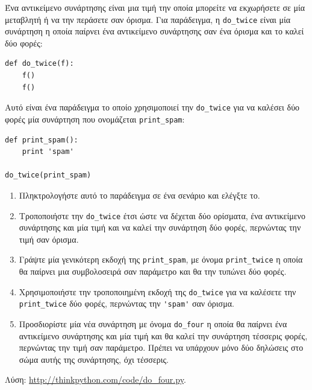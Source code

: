 \documentclass[10pt]{book}
\begin{document}
\begin{exercise}

Ένα αντικείμενο συνάρτησης είναι μια τιμή την οποία μπορείτε να εκχωρήσετε
σε μία μεταβλητή ή να την περάσετε σαν όρισμα. Για παράδειγμα, η \verb"do_twice" είναι μία συνάρτηση η οποία παίρνει ένα αντικείμενο συνάρτησης σαν ένα όρισμα και το καλεί δύο φορές:


\begin{verbatim}
def do_twice(f):
    f()
    f()
\end{verbatim}

Αυτό είναι ένα παράδειγμα το οποίο χρησιμοποιεί την \verb"do_twice" για να καλέσει δύο φορές μία συνάρτηση που ονομάζεται \verb"print_spam":


\begin{verbatim}
def print_spam():
    print 'spam'

do_twice(print_spam)
\end{verbatim}

\begin{enumerate}


\item Πληκτρολογήστε αυτό το παράδειγμα σε ένα σενάριο και ελέγξτε το.


\item Τροποποιήστε την \verb"do_twice" έτσι ώστε να δέχεται δύο ορίσματα, ένα
αντικείμενο συνάρτησης και μία τιμή και να καλεί την συνάρτηση δύο φορές, περνώντας την τιμή σαν όρισμα.


\item Γράψτε μία γενικότερη εκδοχή της \verb"print_spam", με όνομα
\verb"print_twice" η οποία θα παίρνει μια συμβολοσειρά σαν παράμετρο και θα την
τυπώνει δύο φορές.


\item Χρησιμοποιήστε την τροποποιημένη εκδοχή της \verb"do_twice" για να καλέσετε την \verb"print_twice" δύο φορές, περνώντας την \verb"'spam'" σαν όρισμα.


\item Προσδιορίστε μία νέα συνάρτηση με όνομα \verb"do_four" η οποία θα 
παίρνει ένα αντικείμενο συνάρτησης και μία τιμή και θα καλεί την συνάρτηση τέσσερις φορές, περνώντας την τιμή σαν παράμετρο. Πρέπει να υπάρχουν μόνο δύο δηλώσεις στο σώμα αυτής της συνάρτησης, όχι τέσσερις.


\end{enumerate}

Λύση:  \url{http://thinkpython.com/code/do_four.py}.
\\
\end{exercise}
\end{document}
